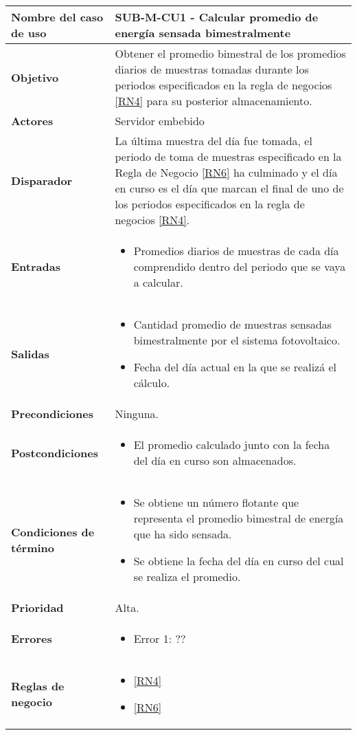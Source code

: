 \begin{longtable}{|J{5cm}|J{10.3cm}|}
	\hline
	\textbf{Nombre del caso de uso} &
		SUB-M-CU1 - Calcular promedio de energía sensada bimestralmente \\ \hline
	\textbf{Objetivo} &
		Obtener el promedio bimestral de los promedios diarios de muestras tomadas durante los periodos especificados en la regla de negocios \ref{RN4} para su posterior almacenamiento. \\ \hline
	\textbf{Actores} &
		Servidor embebido \\ \hline 
	\textbf{Disparador} & 
		La última muestra del día fue tomada, el periodo de toma de muestras especificado en la Regla de Negocio \ref{RN6} ha culminado y el día en curso es el día que marcan el final de uno de los periodos especificados en la regla de negocios \ref{RN4}. \\ \hline 
	\textbf{Entradas} & 
		\begin{itemize}
				\item Promedios diarios de muestras de cada día comprendido dentro del periodo que se vaya a calcular.
		\end{itemize}\\ \hline 
	\textbf{Salidas} & 
		\begin{itemize}
			\item Cantidad promedio de muestras sensadas bimestralmente por el sistema fotovoltaico.
			\item Fecha del día actual en la que se realizá el cálculo.
		\end{itemize} \\ \hline
	\textbf{Precondiciones} &
		Ninguna.\\ \hline
	\textbf{Postcondiciones} &
		\begin{itemize}
			\item El promedio calculado junto con la fecha del día en curso son almacenados.
		\end{itemize}\\ \hline
	\textbf{Condiciones de término} & 
		\begin{itemize}
			\item Se obtiene un número flotante que representa el promedio bimestral de energía que ha sido sensada.
			\item Se obtiene la fecha del día en curso del cual se realiza el promedio.
		\end{itemize} \\ \hline 
	\textbf{Prioridad} & 
		Alta. \\ \hline
	\textbf{Errores} & 
		\begin{itemize}
			\item \label{SUB-M-CU1:Error1} Error 1: ??
		\end{itemize} \\ \hline
	\textbf{Reglas de negocio} & 
		\begin{itemize}
			\item \ref{RN4}
			\item \ref{RN6}
		\end{itemize} \\ \hline

\end{longtable}

